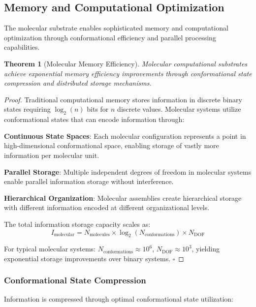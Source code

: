 \documentclass[12pt,a4paper]{article}
\newtheorem{theorem}{Theorem}[section]
\begin{document}
\subsection{Memory and Computational Optimization}

The molecular substrate enables sophisticated memory and computational optimization through conformational efficiency and parallel processing capabilities.

\begin{theorem}[Molecular Memory Efficiency]
Molecular computational substrates achieve exponential memory efficiency improvements through conformational state compression and distributed storage mechanisms.
\end{theorem}

\begin{proof}
Traditional computational memory stores information in discrete binary states requiring $\log_2(n)$ bits for $n$ discrete values. Molecular systems utilize conformational states that can encode information through:

\textbf{Continuous State Spaces}: Each molecular configuration represents a point in high-dimensional conformational space, enabling storage of vastly more information per molecular unit.

\textbf{Parallel Storage}: Multiple independent degrees of freedom in molecular systems enable parallel information storage without interference.

\textbf{Hierarchical Organization}: Molecular assemblies create hierarchical storage with different information encoded at different organizational levels.

The total information storage capacity scales as:
\begin{equation}
I_{\text{molecular}} = N_{\text{molecules}} \times \log_2(N_{\text{conformations}}) \times N_{\text{DOF}}
\end{equation}

For typical molecular systems: $N_{\text{conformations}} \approx 10^6$, $N_{\text{DOF}} \approx 10^3$, yielding exponential storage improvements over binary systems. $\square$
\end{proof}

\subsubsection{Conformational State Compression}

Information is compressed through optimal conformational state utilization:
\end{document}
